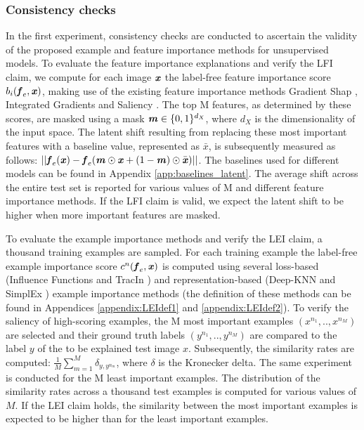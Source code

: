 \subsubsection{Consistency checks} In the first experiment, consistency checks are conducted to ascertain the validity of the proposed example and feature importance methods for unsupervised models. To evaluate the feature importance explanations and verify the LFI claim, we compute for each image $\textbf{\textit{x}}$ the label-free feature importance score $b_i(\textbf{\textit{f}}_e, \textbf{\textit{x}})$, making use of the existing feature importance methods Gradient Shap \cite{lundberg2017unified}, Integrated Gradients \cite{sundararajan2017axiomatic} and Saliency \cite{simonyan2013deep}. The top M features, as determined by these scores, are  masked using a mask $\textbf{\textit{m}} \in \{0,1\}^{d_X}$, where $d_X$ is the dimensionality of the input space. %
The  latent shift resulting from replacing these most important features with a baseline value, represented as $\bar{x}$, is subsequently measured as follows: $|| \textbf{\textit{f}}_e(\textbf{\textit{x}}) - \textbf{\textit{f}}_e(\textbf{\textit{m}} \odot \textbf{\textit{x}} + (1-\textbf{\textit{m}})\odot \bar{\textbf{\textit{x}}})||$. The baselines used for different models can be found in Appendix \ref{app:baselines_latent}. The average shift across the entire test set is reported for various values of M and different feature importance methods. If the LFI claim is valid, we expect the latent shift to be higher when more important features are masked.

To evaluate the example importance methods and verify the LEI claim, a thousand training examples are sampled. For each training example the label-free example importance score $c^n(\textbf{\textit{f}}_e,\textbf{\textit{x}})$ is computed using several loss-based (Influence Functions \cite{koh2017understanding} and TracIn \cite{pruthi2020estimating}) and representation-based (Deep-KNN \cite{papernot2018deep} and SimplEx \cite{crabbe2021explaining}) example importance methods (the definition of these methods can be found in Appendices \ref{appendix:LEIdef1} and \ref{appendix:LEIdef2}). To verify the saliency of high-scoring examples, the M most important examples $(x^{n_1},..,x^{n_M})$ are selected and their ground truth labels $(y^{n_1},..,y^{n_M})$ are compared to the label $y$ of the to be explained test image $x$. Subsequently, the similarity rates are computed: $\frac{1}{M} \sum^M_{m=1} \delta_{y,y^{n_m}} $, where $\delta$ is the Kronecker delta. The same experiment is conducted for the M least important examples. The distribution of the similarity rates across a thousand test examples is computed for various values of $M$. If the LEI claim holds, the similarity between the most important examples is expected to be higher than for the least important examples.

